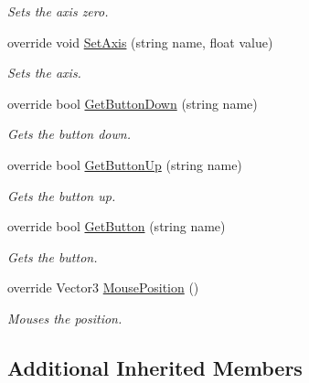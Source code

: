 \begin{DoxyCompactItemize}
\begin{DoxyCompactList}\small\item\em Sets the axis zero. \end{DoxyCompactList}\item 
override void \hyperlink{class_lerp2_assets_1_1_cross_platform_input_1_1_platform_specific_1_1_mobile_input_a3362c1940a517c89512f38a2d13cbde0}{Set\+Axis} (string name, float value)
\begin{DoxyCompactList}\small\item\em Sets the axis. \end{DoxyCompactList}\item 
override bool \hyperlink{class_lerp2_assets_1_1_cross_platform_input_1_1_platform_specific_1_1_mobile_input_a9a81455fe6915c40f681195ff19a769c}{Get\+Button\+Down} (string name)
\begin{DoxyCompactList}\small\item\em Gets the button down. \end{DoxyCompactList}\item 
override bool \hyperlink{class_lerp2_assets_1_1_cross_platform_input_1_1_platform_specific_1_1_mobile_input_ad3aa10ec9452a308cca46d418be0995d}{Get\+Button\+Up} (string name)
\begin{DoxyCompactList}\small\item\em Gets the button up. \end{DoxyCompactList}\item 
override bool \hyperlink{class_lerp2_assets_1_1_cross_platform_input_1_1_platform_specific_1_1_mobile_input_a66bcbe807c0fd99c889d607e82e41cdb}{Get\+Button} (string name)
\begin{DoxyCompactList}\small\item\em Gets the button. \end{DoxyCompactList}\item 
override Vector3 \hyperlink{class_lerp2_assets_1_1_cross_platform_input_1_1_platform_specific_1_1_mobile_input_a94adeaf9c456a99d669348e16a381d88}{Mouse\+Position} ()
\begin{DoxyCompactList}\small\item\em Mouses the position. \end{DoxyCompactList}\end{DoxyCompactItemize}
\subsection*{Additional Inherited Members}



